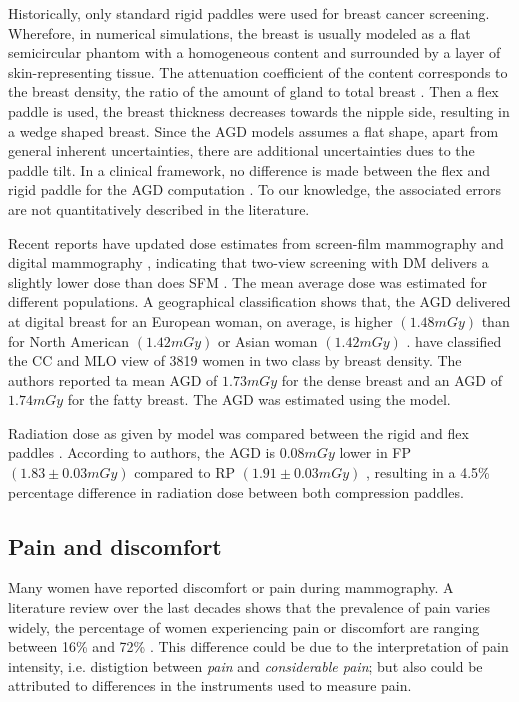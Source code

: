 Historically, only standard rigid paddles were used for breast cancer screening. Wherefore, in numerical simulations, the breast is usually modeled as a flat semicircular phantom with a homogeneous content and surrounded by a layer of skin-representing tissue. The attenuation coefficient of the content corresponds to the breast density, the ratio of the amount of gland to total breast \citep{dance_additional_2000}. Then a flex paddle is used, the breast thickness decreases towards the nipple side, resulting in a wedge shaped breast.  Since the AGD models assumes a flat shape, apart from general inherent uncertainties, there are additional uncertainties dues to the paddle tilt. In a clinical framework, no difference is made between the flex and rigid paddle for the AGD computation \citep{broeders_comparison_2015}. To our knowledge, the associated errors are not quantitatively described in the literature.  

Recent reports have updated dose estimates from screen-film mammography and digital mammography , indicating that two-view screening with DM delivers a slightly lower dose than does SFM . The mean average dose was estimated for different populations. A geographical classification shows that, the AGD delivered at digital breast  for an European woman, on average, is higher  $(1.48 mGy)$   than for North American $(1.42 mGy)$ or Asian woman $(1.42 mGy)$ \citep{geeraert_breast_2012}. \cite{osteraas_average_2018} have classified the CC and MLO view of 3819 women in two class by breast density. The authors reported ta mean AGD of $1.73 mGy$ for the dense breast and an AGD of $1.74 mGy$ for the fatty breast. The  AGD was estimated using the \cite{dance_additional_2000} model.  

Radiation dose as given by \cite{dance_additional_2000} model was compared between the rigid and flex paddles  \citep{broeders_comparison_2015}. According to authors,  the AGD is $0.08 mGy$ lower in FP $(1.83 \pm  0.03 mGy)$ compared to RP $(1.91  \pm  0.03 mGy)$ , resulting in a 4.5\% percentage difference in radiation dose between both compression paddles.

\subsection{Pain and discomfort}
Many women have reported discomfort or pain during mammography. A literature review over the last decades shows that the  prevalence of pain varies widely, the percentage of women experiencing pain or discomfort are ranging between 16\% and 72\% \citep{keemers_pain_2000, peipins_impact_2006,dullum_rates_2000, whelehan_effect_2013}. This difference could be due to the interpretation of pain intensity, i.e. distigtion between \textit{pain} and \textit{considerable pain};  but also could be attributed to differences in the instruments used to measure pain. 

